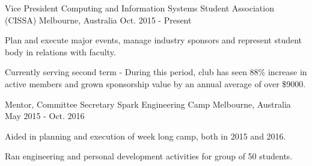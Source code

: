 \begin{cventries}
  \cventry
    {Vice President}
    {Computing and Information Systems Student Association (CISSA)}
    {Melbourne, Australia}
    {Oct. 2015 - Present}
    {
      \begin{cvitems}
        \item {Plan and execute major events, manage industry sponsors and represent student body in relations with faculty.}
        \item {Currently serving second term - During this period, club has seen 88\% increase in active members and grown sponsorship value by an annual average of over \$9000.}
      \end{cvitems}
    }
    \cventry
    {Mentor, Committee Secretary}
    {Spark Engineering Camp}
    {Melbourne, Australia}
    {May 2015 - Oct. 2016}
    {
      \begin{cvitems}
        \item {Aided in planning and execution of week long camp, both in 2015 and 2016.}
        \item {Ran engineering and personal development activities for group of 50 students. }
      \end{cvitems}
    }
\end{cventries}
